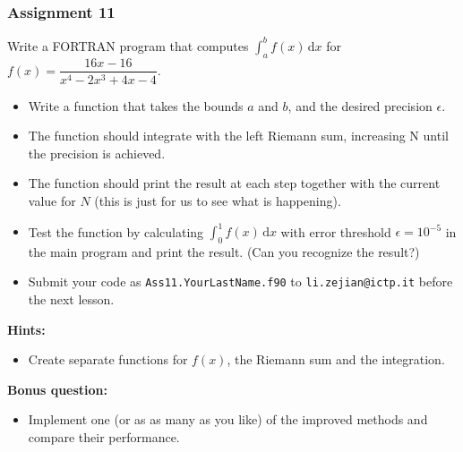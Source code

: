 \documentclass[11pt,aspectratio=169,handout]{beamer}
\begin{document}
\begin{frame}
\frametitle{Assignment 11}
Write a FORTRAN program that computes $\int_a^b f(x)\, \mathrm{d}x$ for  $f(x) = \dfrac{16x-16}{x^4 - 2x^3+4x-4}$.%
\begin{itemize}
\item Write a function that takes the bounds $a$ and $b$, and the desired precision $\epsilon$.
\pause
\item The function should integrate with the left Riemann sum, increasing N until the precision is achieved.
\pause
\item The function should print the result at each step together with the current value for $N$ (this is just for us to see what is happening).
\pause
\item Test the function by calculating $\int_0^1 f(x)\, \mathrm{d}x$ with error threshold $\epsilon=10^{-5}$ in the main program and print the result. (Can you recognize the result?)
\pause
\item Submit your code as \texttt{Ass11.YourLastName.f90} to \texttt{li.zejian@ictp.it} before the next lesson.
\end{itemize}
\textbf{Hints:}
\begin{itemize}
\item Create separate functions for $f(x)$, the Riemann sum and the integration.
\end{itemize}
\pause
\textbf{Bonus question:}
\begin{itemize}
	\item Implement one (or as as many as you like) of the improved methods and compare their performance.
\end{itemize}

\end{frame}
\end{document}
